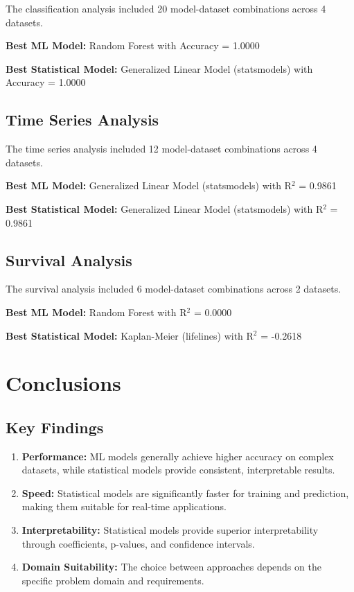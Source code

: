 \documentclass[11pt,a4paper]{article}
\begin{document}
The classification analysis included 20 model-dataset combinations across 4 datasets.

\textbf{Best ML Model:} Random Forest with Accuracy = 1.0000

\textbf{Best Statistical Model:} Generalized Linear Model (statsmodels) with Accuracy = 1.0000

\subsection{Time Series Analysis}

The time series analysis included 12 model-dataset combinations across 4 datasets.

\textbf{Best ML Model:} Generalized Linear Model (statsmodels) with R$^2$ = 0.9861

\textbf{Best Statistical Model:} Generalized Linear Model (statsmodels) with R$^2$ = 0.9861

\subsection{Survival Analysis}

The survival analysis included 6 model-dataset combinations across 2 datasets.

\textbf{Best ML Model:} Random Forest with R$^2$ = 0.0000

\textbf{Best Statistical Model:} Kaplan-Meier (lifelines) with R$^2$ = -0.2618

\section{Conclusions}

\subsection{Key Findings}

\begin{enumerate}
\item \textbf{Performance:} ML models generally achieve higher accuracy on complex datasets, while statistical models provide consistent, interpretable results.
\item \textbf{Speed:} Statistical models are significantly faster for training and prediction, making them suitable for real-time applications.
\item \textbf{Interpretability:} Statistical models provide superior interpretability through coefficients, p-values, and confidence intervals.
\item \textbf{Domain Suitability:} The choice between approaches depends on the specific problem domain and requirements.
\end{enumerate}
\end{document}
